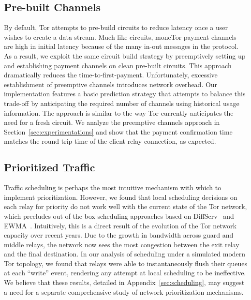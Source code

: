 \subsection{Pre-built Channels} By default, Tor attempts to pre-build circuits to reduce latency once a user wishes to create a data stream.
Much like circuits, moneTor payment channels are high in initial latency because of the many in-out messages in the protocol.
As a result, we exploit the same circuit build strategy by preemptively setting up and establishing payment channels on clean pre-built circuits.
This approach dramatically reduces the time-to-first-payment.
Unfortunately, excessive establishment of preemptive channels introduces network overhead.
Our implementation features a basic prediction strategy that attempts to balance this trade-off by anticipating the required number of channels using historical usage information.
The approach is similar to the way Tor currently anticipates the need for a fresh circuit.
We analyze the preemptive channels approach in Section~\ref{sec:experimentations} and show that the payment confirmation time matches the round-trip-time of the client-relay connection, as expected.

\subsection{Prioritized Traffic}
\label{subsub:prioritized}

Traffic scheduling is perhaps the most intuitive mechanism with which to implement prioritization.
However, we found that local scheduling decisions on each relay for priority do not work well with the current state of the Tor network, which precludes out-of-the-box scheduling approaches based on DiffServ~\cite{dovrolis1999case} and EWMA~\cite{tang2010improved}.
Intuitively, this is a direct result of the evolution of the Tor network capacity over recent years.
Due to the growth in bandwidth across guard and middle relays, the network now sees the most congestion between the exit relay and the final destination.
In our analysis of scheduling under a simulated modern Tor topology, we found that relays were able to instantaneously flush their queues at each ``write'' event, rendering any attempt at local scheduling to be ineffective.
We believe that these results, detailed in Appendix~\ref{sec:scheduling}, may suggest a need for a separate comprehensive study of network prioritization mechanisms.

